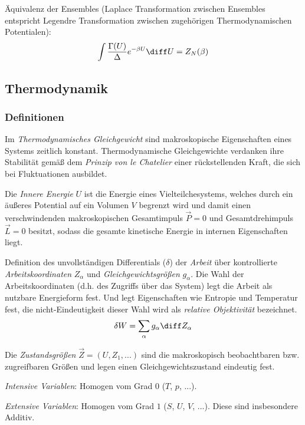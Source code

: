\documentclass[11pt]{article}
\numberwithin{equation}{section}
\begin{document}
          Äquivalenz der Ensembles (Laplace Transformation zwischen Ensembles entspricht Legendre Transformation zwischen zugehörigen Thermodynamischen Potentialen):
          \begin{equation}
            \int \frac{\Gamma(U)}{\Delta} e^{-\beta U} \diff U = Z_N(\beta)
          \end{equation}


    \subsection{Thermodynamik}
      \subsubsection{Definitionen}
        Im \emph{Thermodynamisches Gleichgewicht} sind makroskopische Eigenschaften eines Systems zeitlich konstant. Thermodynamische Gleichgewichte verdanken ihre Stabilität gemäß dem \emph{Prinzip von le Chatelier} einer rückstellenden Kraft, die sich bei Fluktuationen ausbildet. \vsp

        Die \emph{Innere Energie} $U$ ist die Energie eines Vielteilchesystems, welches durch ein äußeres Potential auf ein Volumen $V$ begrenzt wird und damit einen verschwindenden makroskopischen Gesamtimpuls $\vec{P}=0$ und Gesamtdrehimpuls $\vec{L} = 0$ besitzt, sodass die gesamte kinetische Energie in internen Eigenschaften liegt. \vsp

        Definition des unvollständigen Differentials ($\delta$) der \emph{Arbeit} über kontrollierte \emph{Arbeitskoordinaten} $Z_\alpha$ und \emph{Gleichgewichtsgrößen} $g_\alpha$. Die Wahl der Arbeitskoordinaten (d.h. des Zugriffs über das System) legt die Arbeit als nutzbare Energieform fest. Und legt Eigenschaften wie Entropie und Temperatur fest, die nicht-Eindeutigkeit dieser Wahl wird als \emph{relative Objektivität} bezeichnet.
        \begin{equation}
          \delta W = \sum_\alpha g_\alpha \diff Z_\alpha
        \end{equation} \vsp

        Die \emph{Zustandsgrößen} $\vec{Z}=\left(U, Z_1,... \right)$ sind die makroskopisch beobachtbaren bzw. zugreifbaren Größen und legen einen Gleichgewichtszustand eindeutig fest. \vsp

        \emph{Intensive Variablen}: Homogen vom Grad $0$ ($T$, $p$, ...). \vsp

        \emph{Extensive Variablen}: Homogen vom Grad $1$ ($S$, $U$, $V$, ...). Diese sind insbesondere Additiv. \vsp
\end{document}
